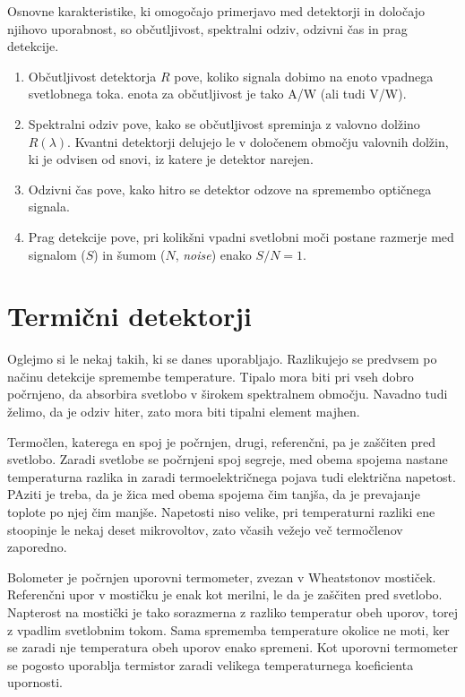 Osnovne karakteristike, ki omogočajo primerjavo med detektorji in določajo njihovo uporabnost,
so občutljivost, spektralni odziv, odzivni čas in prag detekcije. 

\begin{enumerate}
\item Občutljivost detektorja $R$ pove, koliko signala dobimo na enoto vpadnega svetlobnega toka. 
enota za občutljivost je tako A/W (ali tudi V/W). 
\item Spektralni odziv pove, kako se občutljivost spreminja z valovno dolžino $R(\lambda)$. 
Kvantni detektorji delujejo le v določenem območju valovnih dolžin, ki je odvisen od snovi, 
iz katere je detektor narejen. 
\item Odzivni čas pove, kako hitro se detektor odzove na spremembo optičnega signala. 
\item Prag detekcije pove, pri kolikšni vpadni svetlobni moči postane razmerje med signalom ($S$)
in šumom ($N$, {\it noise}) enako $S/N = 1$. 
\end{enumerate}


\section{Termični detektorji}




Oglejmo si le  nekaj takih, ki se danes uporabljajo. Razlikujejo se predvsem po načinu
detekcije spremembe temperature. Tipalo mora biti pri vseh dobro počrnjeno, da absorbira
svetlobo v širokem spektralnem območju. Navadno tudi želimo, da je odziv hiter, zato mora 
biti tipalni element majhen.

Termočlen, katerega en spoj je počrnjen, drugi, referenčni, pa je zaščiten pred svetlobo.
Zaradi svetlobe se počrnjeni spoj segreje, med obema spojema nastane temperaturna razlika in 
zaradi termoelektričnega pojava tudi električna napetost. PAziti je treba, da je žica med 
obema spojema čim tanjša, da je prevajanje toplote po njej čim manjše. Napetosti niso velike,
pri temperaturni razliki ene stoopinje le nekaj deset mikrovoltov, zato včasih vežejo 
več termočlenov zaporedno.

Bolometer je počrnjen uporovni termometer, zvezan v Wheatstonov mostiček. Referenčni upor v
mostičku je enak kot merilni, le da je zaščiten pred svetlobo. Napterost na mostički je tako 
sorazmerna z razliko temperatur obeh uporov, torej z vpadlim svetlobnim tokom. Sama
sprememba temperature okolice ne moti, ker se zaradi nje temperatura obeh uporov enako spremeni. 
Kot uporovni termometer se pogosto uporablja termistor zaradi velikega temperaturnega koeficienta
upornosti.

